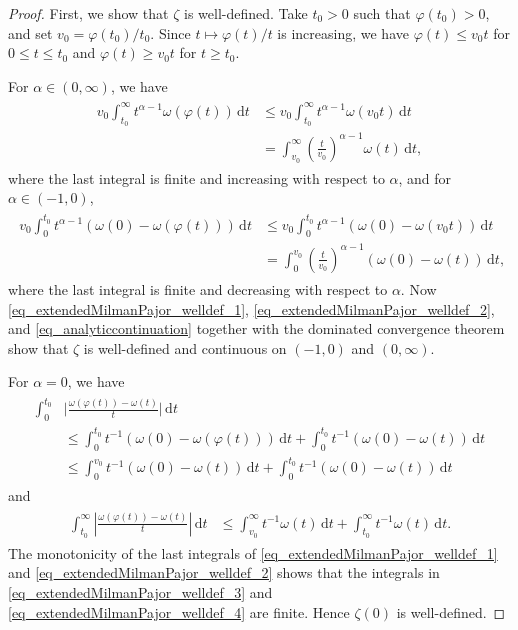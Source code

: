 \documentclass{amsart}
\renewcommand{\d}{\,\mathrm{d}}
\begin{document}
\begin{proof}
First, we show that $\zeta$ is well-defined.
Take $t_0 > 0$ such that $\varphi(t_0) > 0$, and set $v_0 = \varphi(t_0)/{t_0}$. Since $t\mapsto\varphi(t)/t$ is increasing, we have $\varphi(t) \leq v_0 t$ for $0 \leq t \leq t_0$ and $\varphi(t) \geq v_0 t$ for $t \geq t_0$.

For $\alpha \in (0, \infty)$, we have
\begin{align}
\begin{split}
\label{eq_extendedMilmanPajor_welldef_1}
v_0 \int_{t_0}^\infty t^{\alpha-1} \omega(\varphi(t)) \d t
&\leq v_0 \int_{t_0}^\infty t^{\alpha-1} \omega(v_0 t) \d t\\
&= \int_{v_0}^\infty \left(\frac t{v_0}\right)^{\alpha-1} \omega(t) \d t,
\end{split}
\end{align}
where the last integral is finite and increasing with respect to $\alpha$, and for $\alpha \in (-1,0)$,
\begin{align}
\begin{split}
\label{eq_extendedMilmanPajor_welldef_2}
v_0 \int_0^{t_0} t^{\alpha-1} (\omega(0) - \omega(\varphi(t))) \d t
&\leq v_0 \int_0^{t_0} t^{\alpha-1} (\omega(0) - \omega(v_0 t)) \d t\\
&= \int_0^{v_0} \left(\frac t{v_0}\right)^{\alpha-1} (\omega(0) - \omega(t)) \d t,
\end{split}
\end{align}
where the last integral is finite and decreasing with respect to $\alpha$.
Now \eqref{eq_extendedMilmanPajor_welldef_1}, \eqref{eq_extendedMilmanPajor_welldef_2}, and \eqref{eq_analyticcontinuation} together with the dominated convergence theorem show that $\zeta$ is well-defined and continuous on $(-1, 0)$ and $(0, \infty)$. 

For $\alpha = 0$, we have
\begin{align}
\begin{split}
\label{eq_extendedMilmanPajor_welldef_3}
\int_0^{t_0} &\Big|\frac{\omega(\varphi(t)) - \omega(t)}{t}\Big| \d t\\
&\leq \int_0^{t_0} t^{-1} (\omega(0) - \omega(\varphi(t))) \d t + \int_0^{t_0} t^{-1} (\omega(0) - \omega(t)) \d t \\
&\leq \int_0^{v_0} t^{-1} (\omega(0) - \omega(t)) \d t + \int_0^{t_0} t^{-1} (\omega(0) - \omega(t)) \d t
\end{split}
\end{align}
and
\begin{align}
\begin{split}
\label{eq_extendedMilmanPajor_welldef_4}
\int_{t_0}^\infty \left|\frac{\omega(\varphi(t))- \omega(t)}{t}\right| \d t
&\leq \int_{v_0}^\infty t^{-1} \omega(t) \d t + \int_{t_0}^\infty t^{-1} \omega(t) \d t.
\end{split}
\end{align}
The monotonicity of the last integrals of \eqref{eq_extendedMilmanPajor_welldef_1} and \eqref{eq_extendedMilmanPajor_welldef_2} shows that the integrals in \eqref{eq_extendedMilmanPajor_welldef_3} and \eqref{eq_extendedMilmanPajor_welldef_4} are finite. Hence $\zeta(0)$ is well-defined.


\end{proof}
\end{document}
